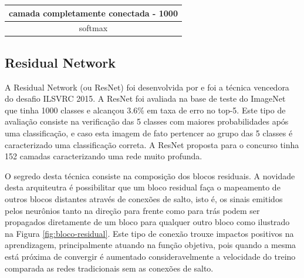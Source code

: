 \begin{table}[]
\begin{tabular}{|c|c|c|c|c|c|}
\multicolumn{6}{|c|}{camada completamente conectada - 1000}                                                                                                                                                                                                                                                                                                                                                                                   \\ \hline
\multicolumn{6}{|c|}{softmax}                                                                                                                                                                                                                                                                                                                                                                                                                 \\ \hline
\end{tabular}
\end{table}

\subsection{Residual Network}
A Residual Network (ou ResNet) foi desenvolvida por \cite{he2016deep} e foi a técnica vencedora do desafio ILSVRC 2015. A ResNet foi avaliada na base de teste do ImageNet que tinha 1000 classes e alcançou 3.6\% em taxa de erro no top-5. Este tipo de avaliação consiste na verificação das 5 classes com maiores probabilidades após uma classificação, e caso esta imagem de fato pertencer ao grupo das 5 classes é caracterizado uma classificação correta. A ResNet proposta para o concurso tinha 152 camadas caracterizando uma rede muito profunda. 

O segredo desta técnica consiste na composição dos blocos residuais. A novidade desta arquiteutra é possibilitar que um bloco residual faça o mapeamento de outros blocos distantes através de conexões de salto, isto é, os sinais emitidos pelos neurônios tanto na direção para frente como para trás podem ser propagados diretamente de um bloco para qualquer outro bloco como ilustrado na Figura \ref{fig:bloco-residual}. Este tipo de conexão trouxe impactos positivos na aprendizagem, principalmente atuando na função objetiva, pois quando a mesma está próxima de convergir é aumentado consideravelmente a velocidade do treino comparada as redes tradicionais sem as conexões de salto.   


